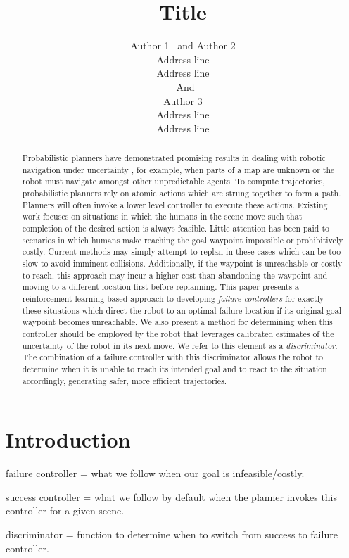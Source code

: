 \documentclass[letterpaper]{article}
\title{Title}
\author{Author 1 \ and Author 2\\
Address line\\
Address line\\
\ And\\
Author 3\\
Address line\\
Address line
}
\begin{document}
	
	\maketitle
	
	\begin{abstract}
		Probabilistic planners have demonstrated promising results in dealing with robotic navigation under uncertainty \cite{ppcp}, for example, when parts of a map are unknown or the robot must navigate amongst other unpredictable agents. To compute trajectories, probabilistic planners rely on atomic actions which are strung together to form a path. Planners will often invoke a lower level controller to execute these actions. Existing work focuses on situations in which the humans in the scene move such that completion of the desired action is always feasible. Little attention has been paid to scenarios in which humans make reaching the goal waypoint impossible or prohibitively costly. Current methods may simply attempt to replan in these cases which can be too slow to avoid imminent collisions. Additionally, if the waypoint is unreachable or costly to reach, this approach may incur a higher cost than abandoning the waypoint and moving to a different location first before replanning. This paper presents a reinforcement learning based approach to developing \textit{failure controllers} for exactly these situations which direct the robot to an optimal failure location if its original goal waypoint becomes unreachable. We also present a method for determining when this controller should be employed by the robot that leverages calibrated estimates of the uncertainty of the robot in its next move. We refer to this element as a \textit{discriminator}. The combination of a failure controller with this discriminator allows the robot to determine when it is unable to reach its intended goal and to react to the situation accordingly, generating safer, more efficient trajectories.
	\end{abstract}
	
	\section{Introduction}
		failure controller = what we follow when our goal is infeasible/costly.
		
		success controller = what we follow by default when the planner invokes this controller for a given scene.
		
		discriminator = function to determine when to switch from success to failure controller.
\end{document}
